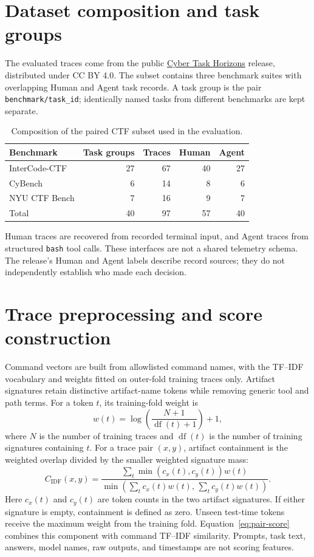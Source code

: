 \section{Dataset composition and task groups}
\label{app:details}

The evaluated traces come from the public \href{https://github.com/lyptus-research/cyber-task-horizons-data}{Cyber Task Horizons} release, distributed under CC BY 4.0. The subset contains three benchmark suites with overlapping Human and Agent task records. A task group is the pair \texttt{benchmark/task\_id}; identically named tasks from different benchmarks are kept separate.

\begin{table}[tb]
\centering
\small
\setlength{\tabcolsep}{6pt}
\begin{tabular}{lrrrr}
\toprule
Benchmark & Task groups & Traces & Human & Agent \\
\midrule
InterCode-CTF & 27 & 67 & 40 & 27 \\
CyBench & 6 & 14 & 8 & 6 \\
NYU CTF Bench & 7 & 16 & 9 & 7 \\
\midrule
Total & 40 & 97 & 57 & 40 \\
\bottomrule
\end{tabular}
\caption{Composition of the paired CTF subset used in the evaluation.}
\label{tab:dataset-counts}
\end{table}

Human traces are recovered from recorded terminal input, and Agent traces from structured \texttt{bash} tool calls. These interfaces are not a shared telemetry schema. The release's Human and Agent labels describe record sources; they do not independently establish who made each decision.

\section{Trace preprocessing and score construction}

Command vectors are built from allowlisted command names, with the TF--IDF vocabulary and weights fitted on outer-fold training traces only. Artifact signatures retain distinctive artifact-name tokens while removing generic tool and path terms. For a token $t$, its training-fold weight is
\[
w(t)=\log\!\left(\frac{N+1}{\operatorname{df}(t)+1}\right)+1,
\]
where $N$ is the number of training traces and $\operatorname{df}(t)$ is the number of training signatures containing $t$. For a trace pair $(x,y)$, artifact containment is the weighted overlap divided by the smaller weighted signature mass:
\[
C_{\mathrm{IDF}}(x,y)=
\frac{\sum_t \min(c_x(t),c_y(t))w(t)}
{\min\!\left(\sum_t c_x(t)w(t),\,\sum_t c_y(t)w(t)\right)}.
\]
Here $c_x(t)$ and $c_y(t)$ are token counts in the two artifact signatures. If either signature is empty, containment is defined as zero. Unseen test-time tokens receive the maximum weight from the training fold. Equation~\ref{eq:pair-score} combines this component with command TF--IDF similarity. Prompts, task text, answers, model names, raw outputs, and timestamps are not scoring features.

